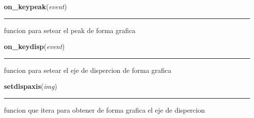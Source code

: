     \label{astroplot_s:on_keypeak}

    \vspace{0.5ex}

\hspace{.8\funcindent}\begin{boxedminipage}{\funcwidth}

    \raggedright \textbf{on\_keypeak}(\textit{event})

    \vspace{-1.5ex}

    \rule{\textwidth}{0.5\fboxrule}
\setlength{\parskip}{2ex}
    funcion para setear el peak de forma grafica

\setlength{\parskip}{1ex}
    \end{boxedminipage}

    \label{astroplot_s:on_keydisp}

    \vspace{0.5ex}

\hspace{.8\funcindent}\begin{boxedminipage}{\funcwidth}

    \raggedright \textbf{on\_keydisp}(\textit{event})

    \vspace{-1.5ex}

    \rule{\textwidth}{0.5\fboxrule}
\setlength{\parskip}{2ex}
    funcion para setear el eje de dispercion de forma grafica

\setlength{\parskip}{1ex}
    \end{boxedminipage}

    \label{astroplot_s:setdispaxis}

    \vspace{0.5ex}

\hspace{.8\funcindent}\begin{boxedminipage}{\funcwidth}

    \raggedright \textbf{setdispaxis}(\textit{img})

    \vspace{-1.5ex}

    \rule{\textwidth}{0.5\fboxrule}
\setlength{\parskip}{2ex}
    funcion que itera para obtener de forma grafica el eje de dispercion

\setlength{\parskip}{1ex}
    \end{boxedminipage}

